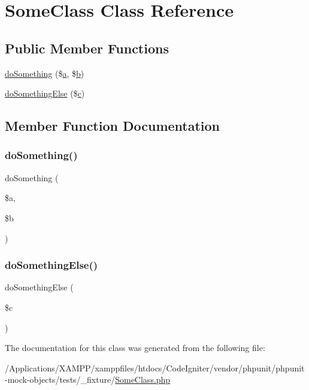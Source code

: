 \hypertarget{class_some_class}{}\section{Some\+Class Class Reference}
\label{class_some_class}
\subsection*{Public Member Functions}
\begin{DoxyCompactItemize}
\item 
\mbox{\hyperlink{class_some_class_a4932953cce198ccf68b3aedd13d51419}{do\+Something}} (\$\mbox{\hyperlink{interfacea}{a}}, \$\mbox{\hyperlink{interfaceb}{b}})
\item 
\mbox{\hyperlink{class_some_class_a66f84eb8ab67fb248fb80a744fa8215e}{do\+Something\+Else}} (\$\mbox{\hyperlink{classc}{c}})
\end{DoxyCompactItemize}


\subsection{Member Function Documentation}
\mbox{\label{class_some_class_a4932953cce198ccf68b3aedd13d51419}} 
\subsubsection{\texorpdfstring{do\+Something()}{doSomething()}}
{\footnotesize\ttfamily do\+Something (\begin{DoxyParamCaption}\item[{}]{\$a,  }\item[{}]{\$b }\end{DoxyParamCaption})}

\mbox{\label{class_some_class_a66f84eb8ab67fb248fb80a744fa8215e}} 
\subsubsection{\texorpdfstring{do\+Something\+Else()}{doSomethingElse()}}
{\footnotesize\ttfamily do\+Something\+Else (\begin{DoxyParamCaption}\item[{}]{\$c }\end{DoxyParamCaption})}



The documentation for this class was generated from the following file\+:\begin{DoxyCompactItemize}
\item 
/\+Applications/\+X\+A\+M\+P\+P/xamppfiles/htdocs/\+Code\+Igniter/vendor/phpunit/phpunit-\/mock-\/objects/tests/\+\_\+fixture/\mbox{\hyperlink{_some_class_8php}{Some\+Class.\+php}}\end{DoxyCompactItemize}
